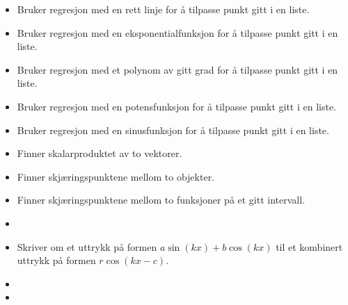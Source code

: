\begin{itemize}
\item {}
{Bruker regresjon med en rett linje for å tilpasse punkt gitt i en liste.}

\item {}
{Bruker regresjon med en eksponentialfunksjon for å tilpasse punkt gitt i en liste.}

\item {}
{Bruker regresjon med et polynom av gitt grad for å tilpasse punkt gitt i en liste.}

\item {}
{Bruker regresjon med en potensfunksjon for å tilpasse punkt gitt i en liste.}

\item {}
{Bruker regresjon med en sinusfunksjon for å tilpasse punkt gitt i en liste.	}

\item {} 
{Finner skalarproduktet av to vektorer. \\
}

\item {}
{Finner skjæringspunktene mellom to objekter. 
}

\item {}
{Finner skjæringspunktene mellom to funksjoner på et gitt intervall.}

\item {}

\item {}
{Skriver om et uttrykk på formen $ a\sin (kx) + b\cos (kx) $ til et kombinert uttrykk på formen $ r\cos (kx-c) $.}

\item {}

\item {}


\end{itemize}
